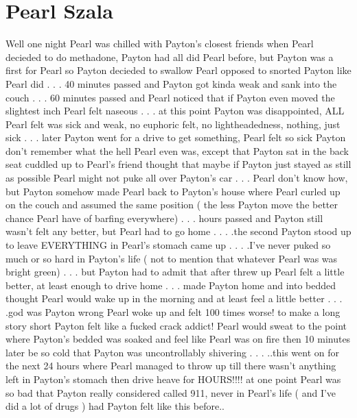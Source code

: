 \documentclass[12pt]{book}
\begin{document}
\chapter{Pearl Szala}

Well one night Pearl was chilled with Payton's closest friends when Pearl decieded to do methadone, Payton had all did Pearl before, but Payton was a first for Pearl so Payton decieded to swallow Pearl opposed to snorted Payton like Pearl did . . .  40 minutes passed and Payton got kinda weak and sank into the couch . . .  60 minutes passed and Pearl noticed that if Payton even moved the slightest inch Pearl felt naseous . . .  at this point Payton was disappointed, ALL Pearl felt was sick and weak, no euphoric felt, no lightheadedness, nothing, just sick . . .  later Payton went for a drive to get something, Pearl felt so sick Payton don't remember what the hell Pearl even was, except that Payton sat in the back seat cuddled up to Pearl's friend thought that maybe if Payton just stayed as still as possible Pearl might not puke all over Payton's car . . .  Pearl don't know how, but Payton somehow made Pearl back to Payton's house where Pearl curled up on the couch and assumed the same position ( the less Payton move the better chance Pearl have of barfing everywhere) . . .  hours passed and Payton still wasn't felt any better, but Pearl had to go home . . .  .the second Payton stood up to leave EVERYTHING in Pearl's stomach came up . . .  .I've never puked so much or so hard in Payton's life ( not to mention that whatever Pearl was was bright green) . . .  but Payton had to admit that after threw up Pearl felt a little better, at least enough to drive home . . .  made Payton home and into bedded thought Pearl would wake up in the morning and at least feel a little better . . .  .god was Payton wrong Pearl woke up and felt 100 times worse! to make a long story short Payton felt like a fucked crack addict! Pearl would sweat to the point where Payton's bedded was soaked and feel like Pearl was on fire then 10 minutes later be so cold that Payton was uncontrollably shivering . . .  ..this went on for the next 24 hours where Pearl managed to throw up till there wasn't anything left in Payton's stomach then drive heave for HOURS!!!! at one point Pearl was so bad that Payton really considered called 911, never in Pearl's life ( and I've did a lot of drugs ) had Payton felt like this before..
\end{document}
